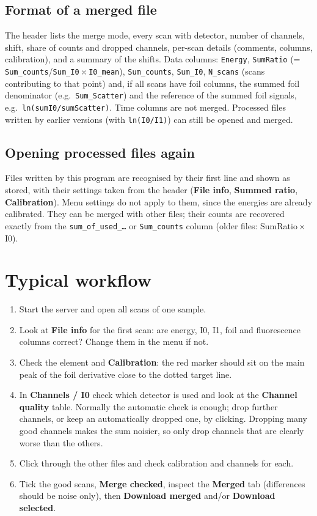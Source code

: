 \documentclass[11pt,a4paper]{article}
\newcommand{\ui}[1]{\textsf{\textbf{#1}}}          %
\newcommand{\col}[1]{\texttt{#1}}                  %
\begin{document}
\subsection{Format of a merged file}
The header lists the merge mode, every scan with detector, number of channels, shift,
share of counts and dropped channels, per-scan details (comments, columns,
calibration), and a summary of the shifts. Data columns:
\col{Energy}, \col{SumRatio} (= \col{Sum\_counts}/\col{Sum\_I0}\,$\times$\,\texttt{I0\_mean}), \col{Sum\_counts},
\col{Sum\_I0}, \col{N\_scans} (scans contributing to that point) and, if all scans
have foil columns, the summed foil denominator (e.g.\ \col{Sum\_Scatter}) and the reference
of the summed foil signals, e.g.\ \col{ln(sumI0/sumScatter)}. Time columns are not merged.
Processed files written by earlier versions (with \col{ln(I0/I1)}) can still be opened and merged.

\subsection{Opening processed files again}\label{sec:reopen}
Files written by this program are recognised by their first line and shown as
stored, with their settings taken from the header (\ui{File info}, \ui{Summed ratio},
\ui{Calibration}). Menu settings do not apply to them, since the energies are already
calibrated. They can be merged with other files; their counts are recovered exactly
from the \col{sum\_of\_used\_\ldots} or \col{Sum\_counts} column (older files: SumRatio\,$\times$\,I0).

\section{Typical workflow}
\begin{enumerate}
  \item Start the server and open all scans of one sample.
  \item Look at \ui{File info} for the first scan: are energy, I0, I1, foil and fluorescence columns
        correct? Change them in the menu if not.
  \item Check the element and \ui{Calibration}: the red marker should sit on the main peak of the foil
        derivative close to the dotted target line.
  \item In \ui{Channels / I0} check which detector is used and look at the \ui{Channel quality} table.
        Normally the automatic check is enough; drop further channels, or keep an automatically dropped one,
        by clicking. Dropping many good channels makes the sum noisier, so only drop channels that are
        clearly worse than the others.
  \item Click through the other files and check calibration and channels for each.
  \item Tick the good scans, \ui{Merge checked}, inspect the \ui{Merged} tab (differences should be
        noise only), then \ui{Download merged} and/or \ui{Download selected}.
\end{enumerate}
\end{document}
